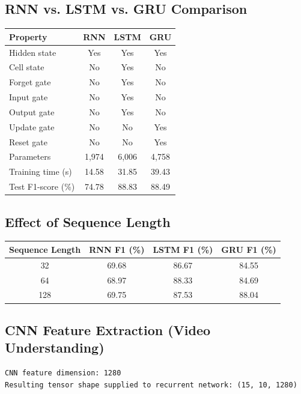\documentclass[10pt]{article}
\begin{document}
\subsection*{RNN vs. LSTM vs. GRU Comparison}
\begin{table}[H]
    \centering
    \begin{tabular}{|l|c|c|c|}
        \hline
        \textbf{Property} & \textbf{RNN} & \textbf{LSTM} & \textbf{GRU} \\ \hline
        Hidden state & Yes & Yes & Yes \\ \hline
        Cell state & No & Yes & No \\ \hline
        Forget gate & No & Yes & No \\ \hline
        Input gate & No & Yes & No \\ \hline
        Output gate & No & Yes & No \\ \hline
        Update gate & No & No & Yes \\ \hline
        Reset gate & No & No & Yes \\ \hline
        Parameters & 1,974 & 6,006 & 4,758 \\ \hline
        Training time (s) & 14.58 & 31.85 & 39.43 \\ \hline
        Test F1-score (\%) & 74.78 & 88.83 & 88.49 \\ \hline
    \end{tabular}
\end{table}

\subsection*{Effect of Sequence Length}
\begin{table}[H]
    \centering
    \begin{tabular}{|c|c|c|c|}
        \hline
        \textbf{Sequence Length} & \textbf{RNN F1 (\%)} & \textbf{LSTM F1 (\%)} & \textbf{GRU F1 (\%)} \\ \hline
        32 & 69.68 & 86.67 & 84.55 \\ \hline
        64 & 68.97 & 88.33 & 84.69 \\ \hline
        128 & 69.75 & 87.53 & 88.04 \\ \hline
    \end{tabular}
\end{table}

\subsection*{CNN Feature Extraction (Video Understanding)}
\begin{verbatim}
CNN feature dimension: 1280
Resulting tensor shape supplied to recurrent network: (15, 10, 1280)
\end{verbatim}
\end{document}
